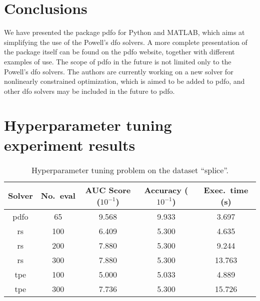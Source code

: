 \documentclass[11pt,draft]{article}
\numberwithin{equation}{section}
\begin{document}
\section{Conclusions}

We have presented the package \gls{pdfo} for Python and MATLAB, which aims at simplifying the use of the Powell's \gls{dfo} solvers.
A more complete presentation of the package itself can be found on the \gls{pdfo} website, together with different examples of use.
The scope of \gls{pdfo} in the future is not limited only to the Powell's \gls{dfo} solvers.
The authors are currently working on a new solver for nonlinearly constrained optimization, which is aimed to be added to \gls{pdfo}, and other \gls{dfo} solvers may be included in the future to \gls{pdfo}.

\printbibliography

\appendix

\section{Hyperparameter tuning experiment results}
\label{sec:htres}

\begin{table}[!ht]
    \caption{Hyperparameter tuning problem on the dataset \enquote{splice}.}
    \centering
    \begin{tabular}{cS[table-format=3]SSS}
        \toprule
        Solver      & {No.\ eval}   & {AUC Score ($10^{-1}$)}   & {Accuracy ($10^{-1}$)}    & {Exec.\ time (\si{\second})}\\
        \midrule
        \gls{pdfo}  & 65            & 9.568                     & 9.933                     & 3.697\\
        \gls{rs}    & 100           & 6.409                     & 5.300                     & 4.635\\
        \gls{rs}    & 200           & 7.880                     & 5.300                     & 9.244\\
        \gls{rs}    & 300           & 7.880                     & 5.300                     & 13.763\\
        \gls{tpe}   & 100           & 5.000                     & 5.033                     & 4.889\\
        \gls{tpe}   & 300           & 7.736                     & 5.300                     & 15.726\\
        \bottomrule
    \end{tabular}
\end{table}
\end{document}

